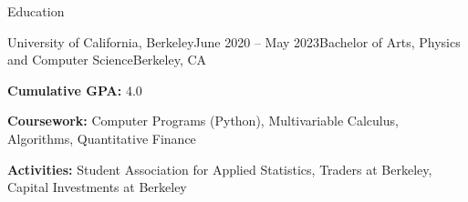 \documentclass{resume} %
\begin{document}

\begin{rSection}{Education}
    \begin{rSubsection}{University of California, Berkeley}{June 2020 – May 2023}{Bachelor of Arts, Physics and Computer Science}{Berkeley, CA}
        \item {\bf Cumulative GPA:} 4.0
        \item {\bf Coursework:} Computer Programs (Python), Multivariable Calculus, Algorithms, Quantitative Finance
        \item {\bf Activities:} Student Association for Applied Statistics, Traders at Berkeley, Capital Investments at Berkeley
        \end{rSubsection}
    \end{rSection}

\end{document}

